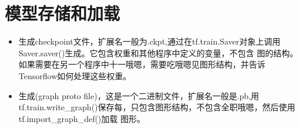 \section{模型存储和加载}
\begin{itemize}
\item 生成checkpoint文件，扩展名一般为.ckpt,通过在tf.train.Saver对象上调用Saver.saver()生成。它包含权重和其他程序中定义的变量，不包含
图的结构。如果需要在另一个程序中十一哦嗯，需要吃哦嗯见图形结构，并告诉Tensorflow如何处理这些权重。
\item 生成(graph proto file)，这是一个二进制文件，扩展名一般是.pb,用tf.train.write\_graph()保存每，只包含图形结构，不包含全职哦嗯，然后使用tf.import\_graph\_def()加载
图形。
\end{itemize}

